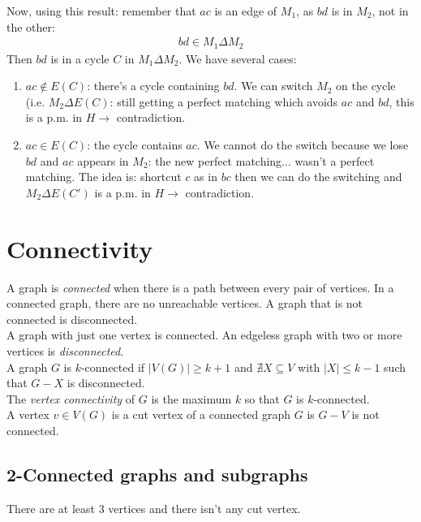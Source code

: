 \documentclass[11pt]{book}
\begin{document}
			Now, using this result: remember that $ac$ is an edge of $M_1$, as $bd$ is in $M_2$, not in the other:
			\begin{eqnarray}
				bd \in M_1 \Delta M_2
			\end{eqnarray}
			Then $bd$ is in a cycle $C$ in $M_1 \Delta M_2$.
			We have several cases:
			\begin{enumerate}
				\item $ac \notin E(C)$: there's a cycle containing $bd$. We can switch $M_2$ on the cycle (i.e. $M_2 \Delta E(C)$: still getting a perfect matching which avoids $ac$ and $bd$, this is a p.m. in $H \longrightarrow $ contradiction.
				\item $ac \in E(C)$: the cycle contains $ac$. We cannot do the switch because we lose $bd$ and $ac$ appears in $M_2$: the new perfect matching... wasn't a perfect matching. The idea is: shortcut $c$ as in $bc$ then we can do the switching and $M_2 \Delta E(C')$ is a p.m. in $H \longrightarrow$ contradiction.
			\end{enumerate}
			
\chapter{Connectivity}
	A graph is \textit{connected} when there is a path between every pair of vertices. In a connected graph, there are no unreachable vertices. A graph that is not connected is disconnected. \\
	
	A graph with just one vertex is connected. An edgeless graph with two or more vertices is \textit{disconnected}.\\
	
	A graph $G$ is $k$-connected if $|V(G)| \geq k + 1$ and $\nexists X \subseteq V$ with $|X| \leq k-1$ such that $G-X$ is disconnected.\\	
	
	The \textit{vertex connectivity} of $G$ is the maximum $k$ so that $G$ is $k$-connected.\\
	
	A vertex $v \in V(G)$ is a cut vertex of a connected graph $G$ is $G -V$ is not connected.

	\section{2-Connected graphs and subgraphs}
		There are at least 3 vertices and there isn't any cut vertex.\\
		
\end{document}
